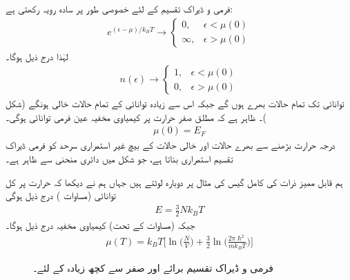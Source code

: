  فرمی و ڈیراک تقسیم  کے لئے خصوصی طور پر سادہ رویہ رکھتی ہے: 
\begin{align*}
e^{(\epsilon - \mu)/k_B T} \to
\begin{cases}
0 , & \epsilon < \mu (0) \\
\infty , & \epsilon > \mu (0)
\end{cases}
\end{align*}
لہٰذا درج ذیل ہوگا۔
\begin{align}
n(\epsilon) \to
\begin{cases}
1, & \epsilon < \mu (0) \\
0, & \epsilon > \mu (0)
\end{cases}
\end{align}
توانائی  تک تمام حالات بھرے ہوں گے جبکہ اس سے زیادہ توانائی کے تمام حالات خالی ہونگے (شکل )۔ ظاہر ہے کہ مطلق صفر حرارت پر کیمیاوی مخفیہ عین فرمی توانائی ہوگی۔ 
\begin{align}
\mu (0) = E_F
\end{align}
درجہ حرارت بڑھنے سے بھرے حالات اور خالی حالات کے بیچ غیر استمراری سرحد کو فرمی ڈیراک تقسیم استمراری بناتا ہے، جو شکل  میں دائری منحنی سے ظاہر ہے۔ 

ہم قابل ممیز ذرات کی کامل گیس کی مثال پر دوبارہ لوٹتے ہیں جہاں ہم نے دیکھا کہ حرارت  پر کل توانائی (مساوات ) درج ذیل ہوگی 
\begin{align}
E = \frac{3}{2} N k_B T
\end{align}
جبکہ (مساوات  کے تحت) کیمیاوی مخفیہ درج ذیل ہوگا۔
\begin{align}
\mu (T) = k_B T \big [ \ln\big( \frac{N}{V} \big) + \frac{3}{2} \ln\big ( \frac{2 \pi \hslash^2}{m k_B T} \big ) \big ]
\end{align}

\begin{figure}
\centering
{}
\caption{فرمی و ڈیراک تقسیم برائے  اور صفر سے کچھ زیادہ  کے لئے۔}
\label{شکل_متماثل_فرمی_ڈیراک_تقسیم}
\end{figure}

